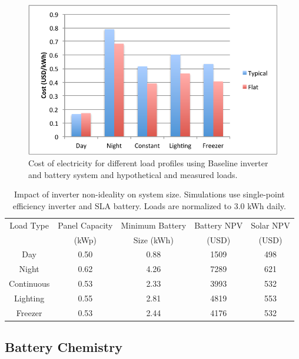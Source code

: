 \documentclass[conference]{IEEEtran}
\begin{document}
\begin{figure}[]
\begin{center}
\includegraphics[width=\columnwidth]{figures/inverter.pdf}
\end{center}
\caption{Cost of electricity for different load profiles using Baseline
inverter and battery system and hypothetical and measured loads.}
\label{fig_inverter}
\end{figure}

\begin{table}
\centering
\begin{tabular}{c c c c c}
Load Type     & Panel Capacity & Minimum Battery & Battery NPV & Solar NPV \\
              & (kWp)          & Size (kWh)      & (USD)       & (USD)     \\
\hline
Day        & 0.50 & 0.88 & 1509 & 498 \\
Night      & 0.62 & 4.26 & 7289 & 621 \\
Continuous & 0.53 & 2.33 & 3993 & 532 \\
Lighting   & 0.55 & 2.81 & 4819 & 553 \\
Freezer    & 0.53 & 2.44 & 4176 & 532 \\

\end{tabular}
\caption{Impact of inverter non-ideality on system size.
Simulations use single-point efficiency inverter and
SLA battery.
Loads are normalized to 3.0 kWh daily.}
\label{table_inverter}
\end{table}

\subsection{Battery Chemistry}
\end{document}
